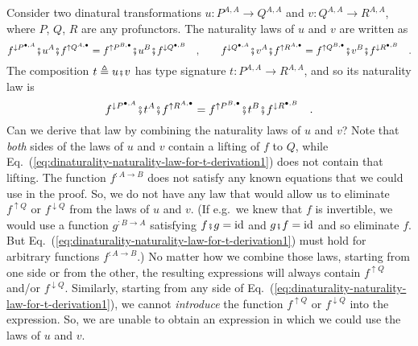 Consider two dinatural transformations $u:P^{A,A}\rightarrow Q^{A,A}$
and $v:Q^{A,A}\rightarrow R^{A,A}$, where $P$, $Q$, $R$ are any
profunctors. The naturality laws of $u$ and $v$ are written as
\[
f^{\downarrow P^{\bullet,A}}\bef u^{A}\bef f^{\uparrow Q^{A,\bullet}}=f^{\uparrow P^{B,\bullet}}\bef u^{B}\bef f^{\downarrow Q^{\bullet,B}}\quad,\quad\quad f^{\downarrow Q^{\bullet,A}}\bef v^{A}\bef f^{\uparrow R^{A,\bullet}}=f^{\uparrow Q^{B,\bullet}}\bef v^{B}\bef f^{\downarrow R^{\bullet,B}}\quad.
\]
 The composition $t\triangleq u\bef v$ has type signature $t:P^{A,A}\rightarrow R^{A,A}$,
and so its naturality law is
\begin{equation}
f^{\downarrow P^{\bullet,A}}\bef t^{A}\bef f^{\uparrow R^{A,\bullet}}=f^{\uparrow P^{B,\bullet}}\bef t^{B}\bef f^{\downarrow R^{\bullet,B}}\quad.\label{eq:dinaturality-naturality-law-for-t-derivation1}
\end{equation}
Can we derive that law by combining the naturality laws of $u$ and
$v$? Note that \emph{both} sides of the laws of $u$ and $v$ contain
a lifting of $f$ to $Q$, while Eq.~(\ref{eq:dinaturality-naturality-law-for-t-derivation1})
does not contain that lifting. The function $f^{:A\rightarrow B}$
does not satisfy any known equations that we could use in the proof.
So, we do not have any law that would allow us to eliminate $f^{\uparrow Q}$
or $f^{\downarrow Q}$ from the laws of $u$ and $v$. (If e.g.~we
knew that $f$ is invertible, we would use a function $g^{:B\rightarrow A}$
satisfying $f\bef g=\text{id}$ and $g\bef f=\text{id}$ and so eliminate
$f$. But Eq.~(\ref{eq:dinaturality-naturality-law-for-t-derivation1})
must hold for arbitrary functions $f^{:A\rightarrow B}$.) No matter
how we combine those laws, starting from one side or from the other,
the resulting expressions will always contain $f^{\uparrow Q}$ and/or
$f^{\downarrow Q}$. Similarly, starting from any side of Eq.~(\ref{eq:dinaturality-naturality-law-for-t-derivation1}),
we cannot \emph{introduce} the function $f^{\uparrow Q}$ or $f^{\downarrow Q}$
into the expression. So, we are unable to obtain an expression in
which we could use the laws of $u$ and $v$. 

